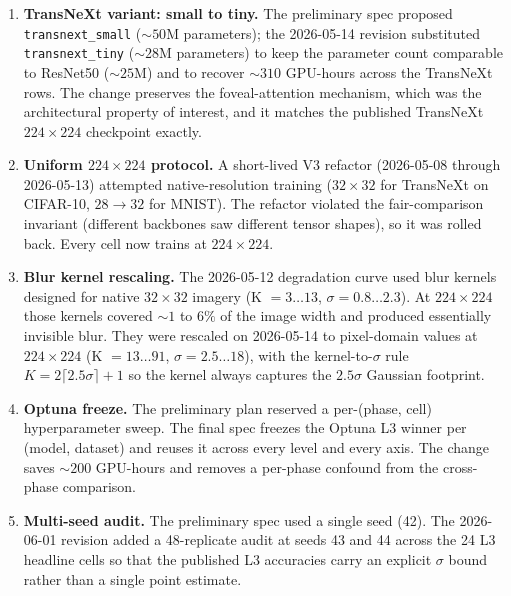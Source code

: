 \begin{enumerate}
  \item \textbf{TransNeXt variant: small to tiny.} The preliminary spec
        proposed \texttt{transnext\_small} ($\sim 50$M parameters); the
        2026-05-14 revision substituted \texttt{transnext\_tiny}
        ($\sim 28$M parameters) to keep the parameter count comparable to ResNet50
        ($\sim 25$M) and to recover $\sim 310$ GPU-hours across the
        TransNeXt rows. The change preserves the foveal-attention
        mechanism, which was the architectural property of interest, and it
        matches the published TransNeXt $224 \times 224$ checkpoint exactly.
  \item \textbf{Uniform $224 \times 224$ protocol.} A short-lived V3
        refactor (2026-05-08 through 2026-05-13) attempted native-resolution
        training ($32 \times 32$ for TransNeXt on CIFAR-10, $28 \rightarrow 32$
        for MNIST). The refactor violated the fair-comparison invariant
        (different backbones saw different tensor shapes), so it was rolled
        back. Every cell now trains at $224 \times 224$.
  \item \textbf{Blur kernel rescaling.} The 2026-05-12 degradation curve
        used blur kernels designed for native $32 \times 32$ imagery
        (K $= 3 \ldots 13$, $\sigma = 0.8 \ldots 2.3$). At $224 \times 224$
        those kernels covered $\sim 1$ to $6 \%$ of the image width and
        produced essentially invisible blur. They were rescaled on
        2026-05-14 to pixel-domain values at $224 \times 224$ (K $= 13 \ldots 91$,
        $\sigma = 2.5 \ldots 18$), with the kernel-to-$\sigma$ rule
        $K = 2 \lceil 2.5 \sigma \rceil + 1$ so the kernel always captures the
        $2.5 \sigma$ Gaussian footprint.
  \item \textbf{Optuna freeze.} The preliminary plan reserved a per-(phase,
        cell) hyperparameter sweep. The final spec freezes the Optuna L3
        winner per (model, dataset) and reuses it across every level and
        every axis. The change saves $\sim 200$ GPU-hours and removes a
        per-phase confound from the cross-phase comparison.
  \item \textbf{Multi-seed audit.} The preliminary spec used a single seed
        (42). The 2026-06-01 revision added a 48-replicate audit at
        seeds 43 and 44 across the 24 L3 headline cells so that the published L3
        accuracies carry an explicit $\sigma$ bound rather than a single
        point estimate.
\end{enumerate}


